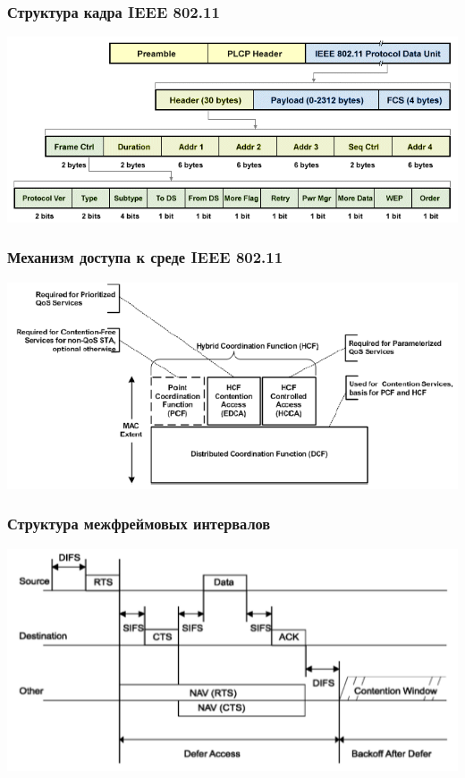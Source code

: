 \documentclass[utf8]{beamer}
\begin{document}
\begin{frame}
\frametitle{Структура кадра IEEE 802.11}
\begin{center}
 \includegraphics[width=\textwidth]{pic/802-11-frame.png}
\end{center}
\end{frame}
\begin{frame}
\frametitle{Механизм доступа к среде IEEE 802.11}
\begin{center}
 \includegraphics[width=\textwidth]{pic/802-11-dcf.png}
\end{center}
\end{frame}
\begin{frame}
\frametitle{Структура межфреймовых интервалов}
\begin{center}
 \includegraphics[width=\textwidth]{pic/ifs-structure.png}
\end{center}
\end{frame}
\end{document}
